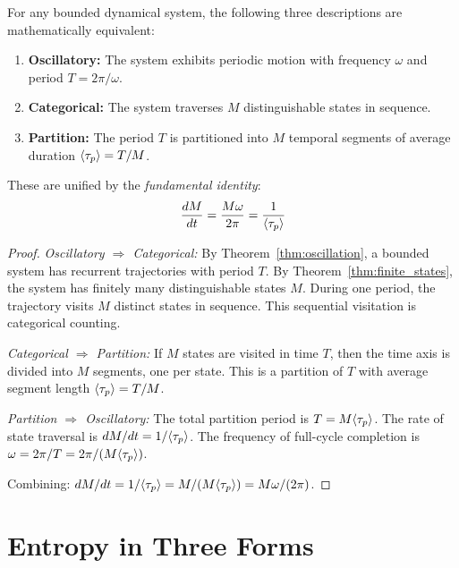 \begin{theorem}
\label{thm:triple}
For any bounded dynamical system, the following three descriptions are mathematically equivalent:
\begin{enumerate}
    \item \textbf{Oscillatory:} The system exhibits periodic motion with frequency $\omega$ and period $T = 2\pi/\omega$.
    \item \textbf{Categorical:} The system traverses $M$ distinguishable states in sequence.
    \item \textbf{Partition:} The period $T$ is partitioned into $M$ temporal segments of average duration $\langle\tau_p\rangle = T/M$.
\end{enumerate}
These are unified by the \emph{fundamental identity}:
\begin{equation}
\label{eq:fundamental_identity}
    \frac{dM}{dt} = \frac{M\omega}{2\pi} = \frac{1}{\langle\tau_p\rangle}
\end{equation}
\end{theorem}

\begin{proof}
\emph{Oscillatory $\Rightarrow$ Categorical:} By Theorem~\ref{thm:oscillation}, a bounded system has recurrent trajectories with period $T$. By Theorem~\ref{thm:finite_states}, the system has finitely many distinguishable states $M$. During one period, the trajectory visits $M$ distinct states in sequence. This sequential visitation is categorical counting.

\emph{Categorical $\Rightarrow$ Partition:} If $M$ states are visited in time $T$, then the time axis is divided into $M$ segments, one per state. This is a partition of $T$ with average segment length $\langle\tau_p\rangle = T/M$.

\emph{Partition $\Rightarrow$ Oscillatory:} The total partition period is $T = M\langle\tau_p\rangle$. The rate of state traversal is $dM/dt = 1/\langle\tau_p\rangle$. The frequency of full-cycle completion is $\omega = 2\pi/T = 2\pi/(M\langle\tau_p\rangle)$.

Combining: $dM/dt = 1/\langle\tau_p\rangle = M/(M\langle\tau_p\rangle) = M\omega/(2\pi)$.
\end{proof}

\section{Entropy in Three Forms}
\label{sec:entropy}


